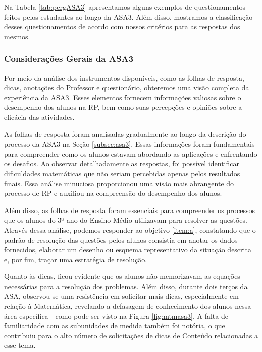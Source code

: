 Na Tabela \ref{tab:pergASA3} apresentamos alguns exemplos de questionamentos feitos pelos estudantes ao longo da ASA3. Além disso, mostramos a classificação desses questionamentos de acordo com nossos critérios para as respostas dos mesmos.

\subsubsection{Considerações Gerais da ASA3}

Por meio da análise dos instrumentos disponíveis, como as folhas de resposta, dicas, anotações do Professor e questionário, obteremos uma visão completa da experiência da ASA3. Esses elementos fornecem informações valiosas sobre o desempenho dos alunos na RP, bem como suas percepções e opiniões sobre a eficácia das atividades.

As folhas de resposta foram analisadas gradualmente ao longo da descrição do processo da ASA3 na Seção \ref{subsec:asa3}. Essas informações foram fundamentais para compreender como os alunos estavam abordando as aplicações e enfrentando os desafios. Ao observar detalhadamente as respostas, foi possível identificar dificuldades matemáticas que não seriam percebidas apenas pelos resultados finais. Essa análise minuciosa proporcionou uma visão mais abrangente do processo de RP e auxiliou na compreensão do desempenho dos alunos.

Além disso, as folhas de resposta foram essenciais para compreender os processos que os alunos do 3º ano do Ensino Médio utilizavam para resolver as questões. Através dessa análise, podemos responder ao objetivo \ref{item:a}, constatando que o padrão de resolução das questões pelos alunos consistia em anotar os dados fornecidos, elaborar um desenho ou esquema representativo da situação descrita e, por fim, traçar uma estratégia de resolução.

Quanto às dicas, ficou evidente que os alunos não memorizavam as equações necessárias para a resolução dos problemas. Além disso, durante dois terços da ASA, observou-se uma resistência em solicitar mais dicas, especialmente em relação à Matemática, revelando a defasagem de conhecimento dos alunos nessa área específica - como pode ser visto na Figura \ref{fig:mtmasa3}. A falta de familiaridade com as subunidades de medida também foi notória, o que contribuiu para o alto número de solicitações de dicas de Conteúdo relacionadas a esse tema.

